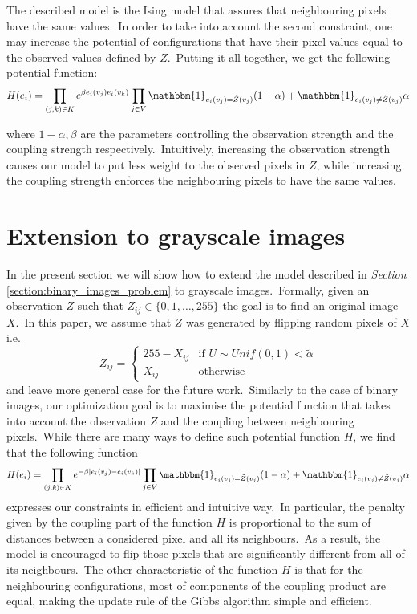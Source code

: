 \documentclass[a4paper, 11pt, onecolumn, openany, titlepage]{report}
\theoremstyle{default_theorem_style}\newtheorem{theorem}{Theorem}
\theoremstyle{default_theorem_style}\newtheorem{definition}{Definition}
\begin{document}
The described model is the Ising model that assures that neighbouring pixels have the same values.\ In order to
take into account the second constraint, one may increase the potential of configurations that have their pixel values
equal to the observed values defined by $Z$.\ Putting it all together, we get the following potential function:
$$
H(e_i) = \prod\limits_{(j, k) \in K} e^{\beta e_i(v_j)e_i(v_k)}
\prod\limits_{j \in V} \mathbbm{1}_{e_i(v_j) = \tilde{Z}(v_j)}(1 - \alpha) +
\mathbbm{1}_{e_i(v_j) \neq \tilde{Z}(v_j)}\alpha
$$

where $1 - \alpha, \beta$ are the parameters controlling the observation strength and the coupling strength
respectively.\ Intuitively, increasing the observation strength causes our model to put less weight to the
observed pixels in $Z$, while increasing the coupling strength enforces the neighbouring pixels to have the
same values.

\section{Extension to grayscale images}

In the present section we will show how to extend the model described in \textit{Section}
\ref{section:binary_images_problem} to grayscale images.\ Formally, given an observation $Z$ such
that $Z_{ij} \in \{0, 1, \dots, 255\}$ the goal is to find an original image $X$.\ In this paper, we assume
that $Z$ was generated by flipping random pixels of $X$ i.e.
$$
Z_{ij} =
\begin{cases}
  255 - X_{ij} &\text{if $U \sim Unif(0, 1) < \tilde{\alpha}$}\\
  X_{ij} &\text{otherwise}
\end{cases}
$$
and leave more general case for the future work.\ Similarly to the case of binary images, our optimization goal is to
maximise the potential function that takes into account the observation $Z$ and the coupling between neighbouring
pixels.\ While there are many ways to define such potential function $H$, we find that the following function
$$
H(e_i) = \prod\limits_{(j, k) \in K} e^{-\beta |e_i(v_j) - e_i(v_k)|}
\prod\limits_{j \in V} \mathbbm{1}_{e_i(v_j) = \tilde{Z}(v_j)}(1 - \alpha) +
\mathbbm{1}_{e_i(v_j) \neq \tilde{Z}(v_j)}\alpha
$$
expresses our constraints in efficient and intuitive way.\ In particular, the penalty given by the coupling part of
the function $H$ is proportional to the sum of distances between a considered pixel and all its neighbours.\ As a
result, the model is encouraged to flip those pixels that are significantly different from all of its
neighbours.\ The other characteristic of the function $H$ is that for the neighbouring configurations, most of
components of the coupling product are equal, making the update rule of the Gibbs algorithm simple and efficient.
\end{document}
